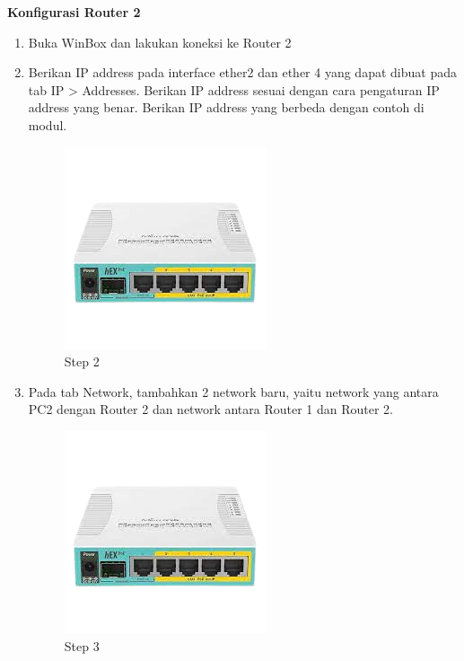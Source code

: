 \begin{center} 
	\textbf{Konfigurasi Router 2}
\end{center}

\begin{enumerate}
	\item Buka WinBox dan lakukan koneksi ke Router 2
	
	\item Berikan IP address pada interface ether2 dan ether 4 yang dapat dibuat pada tab IP > Addresses. Berikan IP address sesuai dengan cara pengaturan IP address yang benar. Berikan IP
	address yang berbeda dengan contoh di modul.
	\begin{figure}[H]
		\centering
		\includegraphics[width=0.5\linewidth]{P1/img/contoh.png}
		\caption{Step 2}
		\label{fig:gambar13}
	\end{figure}
	
	\item Pada tab Network, tambahkan 2 network baru, yaitu network yang antara PC2 dengan Router
	2 dan network antara Router 1 dan Router 2.
	\begin{figure}[H]
		\centering
		\includegraphics[width=0.5\linewidth]{P1/img/contoh.png}
		\caption{Step 3}
		\label{fig:gambar13}
	\end{figure}


\end{enumerate}
